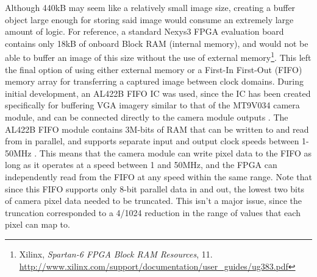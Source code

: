 Although 440kB may seem like a relatively small image size, creating a buffer object large enough for storing said image would consume an extremely large amount of logic. For reference, a standard Nexys3 FPGA evaluation board contains only 18kB of onboard Block RAM (internal memory), and would not be able to buffer an image of this size without the use of external memory\footnote{Xilinx, \textit{Spartan-6 FPGA Block RAM Resources}, 11.\\  \url{http://www.xilinx.com/support/documentation/user_guides/ug383.pdf}}. This left the final option of using either external memory or a First-In First-Out (FIFO) memory array for transferring a captured image between clock domains. During initial development, an AL422B FIFO IC was used, since the IC has been created specifically for buffering VGA imagery similar to that of the MT9V034 camera module, and can be connected directly to the camera module outputs \cite{al422b}. The AL422B FIFO module contains 3M-bits of RAM that can be written to and read from in parallel, and supports separate input and output clock speeds between 1-50MHz \cite{al422b}. This means that the camera module can write pixel data to the FIFO as long as it operates at a speed between 1 and 50MHz, and the FPGA can independently read from the FIFO at any speed within the same range. Note that since this FIFO supports only 8-bit parallel data in and out, the lowest two bits of camera pixel data needed to be truncated. This isn't a major issue, since the truncation corresponded to a 4/1024 reduction in the range of values that each pixel can map to.